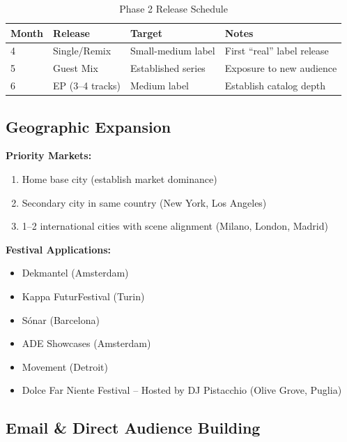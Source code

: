 \documentclass[11pt,a4paper]{article}
\begin{document}
\begin{table}[h!]
\centering
\renewcommand{\arraystretch}{1.3}
\begin{tabularx}{\textwidth}{l l l X}
\toprule
\rowcolor{amaraprimary}
\textcolor{amaracream}{\textbf{Month}} & \textcolor{amaracream}{\textbf{Release}} & \textcolor{amaracream}{\textbf{Target}} & \textcolor{amaracream}{\textbf{Notes}} \\
\midrule
4 & Single/Remix & Small-medium label & First ``real'' label release \\
5 & Guest Mix & Established series & Exposure to new audience \\
6 & EP (3--4 tracks) & Medium label & Establish catalog depth \\
\bottomrule
\end{tabularx}
\caption{Phase 2 Release Schedule}
\end{table}

\subsection{Geographic Expansion}

\noindent\textbf{Priority Markets:}
\begin{enumerate}[leftmargin=*]
    \item Home base city (establish market dominance)
    \item Secondary city in same country (New York, Los Angeles)
    \item 1--2 international cities with scene alignment (Milano, London, Madrid)
\end{enumerate}

\noindent\textbf{Festival Applications:}
\begin{itemize}[leftmargin=*]
    \item Dekmantel (Amsterdam)
    \item Kappa FuturFestival (Turin)
    \item Sónar (Barcelona)
    \item ADE Showcases (Amsterdam)
    \item Movement (Detroit)
    \item Dolce Far Niente Festival -- Hosted by DJ Pistacchio (Olive Grove, Puglia)
\end{itemize}

\subsection{Email \& Direct Audience Building}
\end{document}
